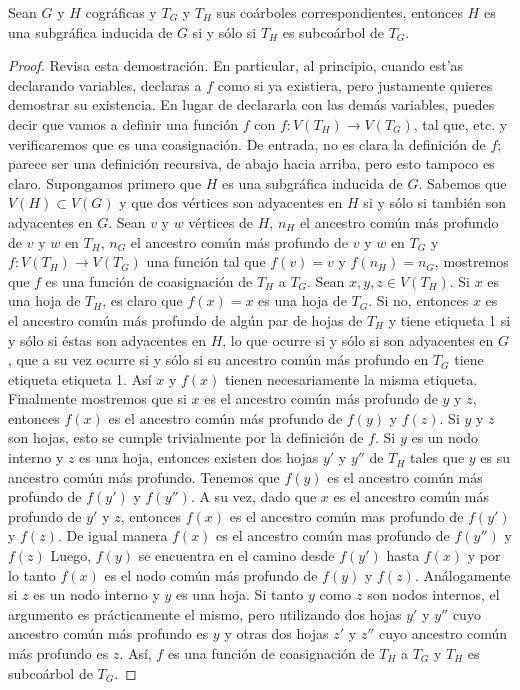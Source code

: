\begin{lemma}\label{lema_subcoa_01}
    Sean $G$ y $H$ cográficas y $T_G$ y $T_H$ sus coárboles correspondientes, entonces $H$ es una subgráfica inducida de $G$ si y sólo si $T_H$ es subcoárbol de $T_G$.
\end{lemma}

\begin{proof}
    {\color{red}
    Revisa esta demostraci\'on.   En particular, al principio, cuando
    est'as declarando variables, declaras a $f$ como si ya existiera,
    pero justamente quieres demostrar su existencia.   En lugar de
    declararla con las dem\'as variables, puedes decir que vamos a
    definir una funci\'on $f$ con $f \colon V(T_H)\rightarrow V(T_G)$,
    tal que, etc. y verificaremos que es una coasignaci\'on.   De
    entrada, no es clara la definici\'on de $f$; parece ser una
    definici\'on recursiva, de abajo hacia arriba, pero esto tampoco
    es claro.
    }
    Supongamos primero que $H$ es una subgráfica inducida de $G$. Sabemos que
    $V(H)\subset V(G)$ y que dos vértices son adyacentes en $H$ si y sólo si
    también son adyacentes en $G$. Sean $v$ y $w$ vértices de $H$, $n_H$ el
    ancestro común más profundo de $v$ y $w$ en $T_H$, $n_G$ el ancestro común
    más profundo de $v$ y $w$ en $T_G$ y $f:V(T_H)\rightarrow V(T_G)$ una
    función tal que $f(v)=v$ y $f(n_H) = n_G$, mostremos que $f$ es una función
    de coasignación de $T_H$ a $T_G$. Sean $x,y,z\in V(T_H)$. Si $x$ es una
    hoja de $T_H$, es claro que $f(x) = x$ es una hoja de $T_G$. Si no,
    entonces $x$ es el ancestro común más profundo de algún par de hojas de
    $T_H$ y tiene etiqueta 1 si y sólo si éstas son adyacentes en $H$, lo que
    ocurre si y sólo si son adyacentes en $G$, que a su vez ocurre si y sólo si
    su ancestro común más profundo en $T_G$ tiene etiqueta etiqueta 1. Así $x$
    y $f(x)$ tienen necesariamente la misma etiqueta. Finalmente mostremos que
    si $x$ es el ancestro común más profundo de $y$ y $z$, entonces $f(x)$ es
    el ancestro común más profundo de $f(y)$ y $f(z)$. Si $y$ y $z$ son hojas,
    esto se cumple trivialmente por la definición de $f$. Si $y$ es un nodo
    interno y $z$ es una hoja, entonces existen dos hojas $y'$ y $y''$ de $T_H$
    tales que $y$ es su ancestro común más profundo. Tenemos que $f(y)$ es el
    ancestro común más profundo de $f(y')$ y $f(y'')$. A su vez, dado que $x$
    es el ancestro común más profundo de $y'$ y $z$, entonces $f(x)$ es el
    ancestro común mas profundo de $f(y')$ y $f(z)$. De igual manera $f(x)$ es
    el ancestro común mas profundo de $f(y'')$ y $f(z)$ Luego, $f(y)$ se
    encuentra en el camino desde $f(y')$ hasta $f(x)$ y por lo tanto $f(x)$ es
    el nodo común más profundo de $f(y)$ y $f(z)$. Análogamente si $z$ es un
    nodo interno y $y$ es una hoja. Si tanto $y$ como $z$ son nodos internos,
    el argumento es prácticamente el mismo, pero utilizando dos hojas $y'$ y
    $y''$ cuyo ancestro común más profundo es $y$ y otras dos hojas $z'$ y
    $z''$ cuyo ancestro común más profundo es $z$. Así, $f$ es una función de
    coasignación de $T_H$ a $T_G$ y $T_H$ es subcoárbol de $T_G$.


\end{proof}
